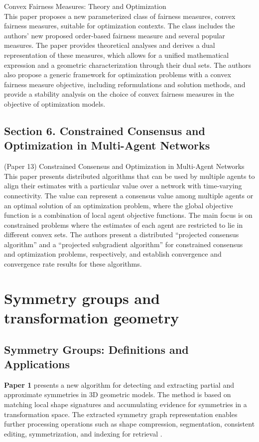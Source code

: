 \documentclass{article}
\begin{document}
\cite{Tsang2022ConvexFM} Convex Fairness Measures: Theory and Optimization \\
This paper proposes a new parameterized class of fairness measures, convex fairness measures, suitable for optimization contexts. The class includes the authors' new proposed order-based fairness measure and several popular measures. The paper provides theoretical analyses and derives a dual representation of these measures, which allows for a unified mathematical expression and a geometric characterization through their dual sets. The authors also propose a generic framework for optimization problems with a convex fairness measure objective, including reformulations and solution methods, and provide a stability analysis on the choice of convex fairness measures in the objective of optimization models.

\subsection{Section 6. Constrained Consensus and Optimization in Multi-Agent Networks}

(Paper 13) Constrained Consensus and Optimization in Multi-Agent Networks \\
This paper presents distributed algorithms that can be used by multiple agents to align their estimates with a particular value over a network with time-varying connectivity. The value can represent a consensus value among multiple agents or an optimal solution of an optimization problem, where the global objective function is a combination of local agent objective functions. The main focus is on constrained problems where the estimates of each agent are restricted to lie in different convex sets. The authors present a distributed ``projected consensus algorithm'' and a ``projected subgradient algorithm'' for constrained consensus and optimization problems, respectively, and establish convergence and convergence rate results for these algorithms.


\section{Symmetry groups and transformation geometry}

\subsection{Symmetry Groups: Definitions and Applications}

\textbf{Paper 1} presents a new algorithm for detecting and extracting partial and approximate symmetries in 3D geometric models. The method is based on matching local shape signatures and accumulating evidence for symmetries in a transformation space. The extracted symmetry graph representation enables further processing operations such as shape compression, segmentation, consistent editing, symmetrization, and indexing for retrieval \cite{Mitra2006PartialAA}.
\end{document}
